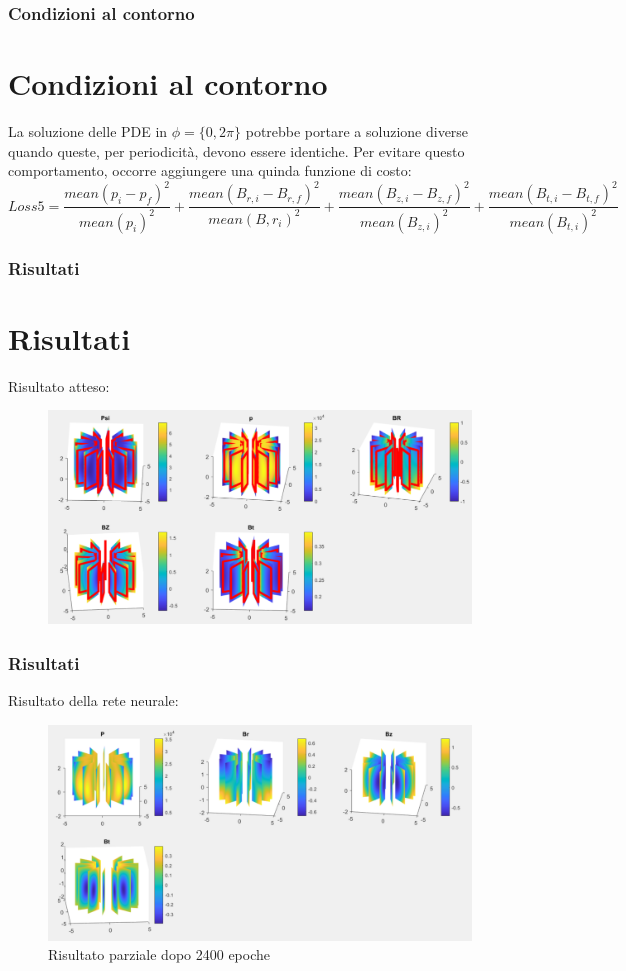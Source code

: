 \documentclass{beamer}
\begin{document}
\begin{frame}
	\frametitle{Condizioni al contorno}
	\section{Condizioni al contorno}
	La soluzione delle PDE in \(\phi = \{ 0,2\pi \} \) potrebbe portare a soluzione diverse quando queste, per periodicità, devono essere identiche. Per evitare questo comportamento, occorre aggiungere una quinda funzione di costo:\begin{equation*}
		Loss5 = \frac{mean{(p_{i}-p_{f})}^{2}}{mean{(p_{i})}^{2}}+\frac{mean{(B_{r,i}-B_{r,f})}^{2}}{mean{(B,r_{i})}^{2}}+\frac{mean{(B_{z,i}-B_{z,f})}^{2}}{mean{(B_{z,i})}^{2}}+\frac{mean{(B_{t,i}-B_{t,f})}^{2}}{mean{(B_{t,i})}^{2}}
	\end{equation*}
\end{frame}
\begin{frame}
	\frametitle{Risultati}
	\section{Risultati}
		Risultato atteso:
		\begin{figure}
			\includegraphics[scale=0.4]{2022-06-07-15-42-03.png}%
		\end{figure}
\end{frame}
\begin{frame}
	\frametitle{Risultati}
	Risultato della rete neurale:
	\begin{figure}
		\includegraphics[scale=0.4]{2022-06-08-18-46-44.png}%
		\caption{Risultato parziale dopo 2400 epoche}
	\end{figure}

\end{frame}
\end{document}
